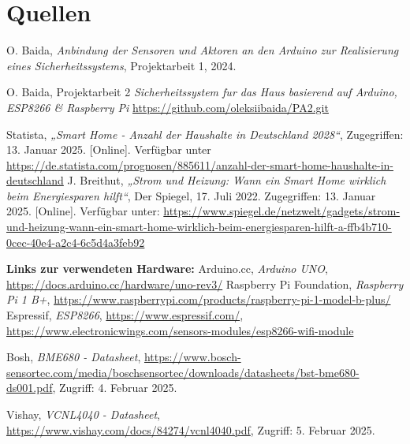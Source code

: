 \documentclass[12pt, letterpaper]{article}
\begin{document}
\section{Quellen}
\begin{thebibliography}{20}
  O. Baida,
  \textit{Anbindung der Sensoren und Aktoren an den Arduino zur Realisierung eines Sicherheitssystems},
  Projektarbeit 1, 2024.

  O. Baida, Projektarbeit 2 \textit{Sicherheitssystem fur das Haus basierend auf Arduino, ESP8266 \& Raspberry Pi} \url{https://github.com/oleksiibaida/PA2.git}
  
  Statista, \textit{„Smart Home - Anzahl der Haushalte in Deutschland 2028“}, Zugegriffen: 13. Januar 2025. [Online]. Verfügbar unter \url{https://de.statista.com/prognosen/885611/anzahl-der-smart-home-haushalte-in-deutschland}
  J. Breithut, \textit{„Strom und Heizung: Wann ein Smart Home wirklich beim Energiesparen hilft“}, Der Spiegel, 17. Juli 2022. Zugegriffen: 13. Januar 2025. [Online]. Verfügbar unter: \url{https://www.spiegel.de/netzwelt/gadgets/strom-und-heizung-wann-ein-smart-home-wirklich-beim-energiesparen-hilft-a-ffb4b710-0cec-40e4-a2c4-6c5d4a3feb92}


  \par \textbf{Links zur verwendeten Hardware:}
  Arduino.cc, \textit{Arduino UNO}, \url{https://docs.arduino.cc/hardware/uno-rev3/}
  Raspberry Pi Foundation, \textit{Raspberry Pi 1 B+}, \url{https://www.raspberrypi.com/products/raspberry-pi-1-model-b-plus/}
  Espressif, \textit{ESP8266}, \url{https://www.espressif.com/}, \url{https://www.electronicwings.com/sensors-modules/esp8266-wifi-module}

  Bosh, \textit{BME680 - Datasheet}, \url{https://www.bosch-sensortec.com/media/boschsensortec/downloads/datasheets/bst-bme680-ds001.pdf}, Zugriff: 4. Februar 2025.

  Vishay, \textit{VCNL4040 - Datasheet}, \url{https://www.vishay.com/docs/84274/vcnl4040.pdf}, Zugriff: 5. Februar 2025.


\end{thebibliography}
\end{document}
